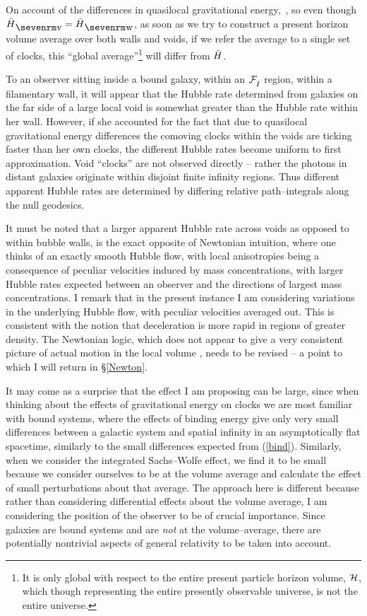 \documentclass[12pt]{article}
\begin{document}
On account of the differences in quasilocal gravitational energy,
\beq \Deriv\dd\tv\tw{}\,,\eeq
so even though $\bH\ns{v}=\bH\ns{w}$, as soon as we try to construct
a present horizon volume average over both walls and voids, if we refer the
average to a single set of clocks, this ``global average''\footnote{It is
only global with respect to the entire present particle horizon volume,
$\cal H$, which though representing the entire presently observable universe,
is not the entire universe.} will differ from $\bH$.

To an observer sitting inside a bound galaxy, within an $\FI$ region,
within a filamentary wall, it will appear that the Hubble rate determined
from galaxies on the far side of a large local void is somewhat greater than
the Hubble rate within her wall. However, if she accounted for the fact that
due to quasilocal gravitational energy differences the comoving clocks
within the voids are ticking faster than her own clocks, the different Hubble
rates become uniform to first approximation. Void ``clocks'' are not
observed directly -- rather the photons in distant galaxies originate
within disjoint finite infinity regions. Thus different apparent Hubble
rates are determined by differing relative path--integrals along the
null geodesics.

It must be noted that a
larger apparent Hubble rate across voids as opposed to within bubble
walls, is the exact opposite of Newtonian intuition, where one thinks
of an exactly smooth Hubble flow, with local anisotropies being
a consequence of peculiar velocities induced by mass concentrations,
with larger Hubble rates expected between an observer and the
directions of largest mass concentrations. I remark that in the present
instance I am considering variations in the underlying Hubble flow,
with peculiar velocities averaged out. This is consistent with the notion
that deceleration is more rapid in regions of greater density.
The Newtonian logic, which does not
appear to give a very consistent picture of actual motion in the
local volume \cite{Whiting1,Whiting2}, needs to be revised -- a
point to which I will return in \S\ref{Newton}.

It may come as a surprise that the effect I am proposing can be large,
since when thinking about the effects of gravitational energy on clocks
we are most familiar with bound systems, where the effects of binding
energy give only very small differences between a galactic system and
spatial infinity in an asymptotically flat spacetime, similarly to
the small differences expected from (\ref{bind}). Similarly, when we
consider the integrated Sachs--Wolfe effect, we find it to be small
because we consider ourselves to be at the volume average and calculate
the effect of small perturbations about that average. The approach here
is different because rather than considering differential effects about
the volume average, I am considering the position of the observer to be
of crucial importance. Since galaxies are bound systems and are {\em not}
at the volume--average, there are potentially nontrivial
aspects of general relativity to be taken into account.
\end{document}

